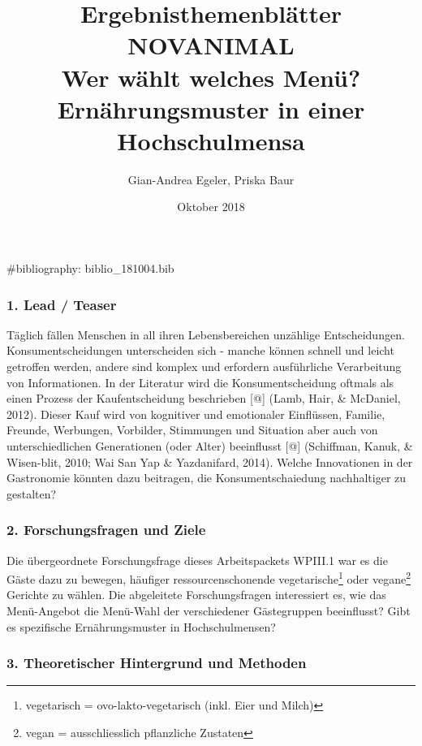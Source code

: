 \documentclass[12pt,ngerman,]{article}
\title{Ergebnisthemenblätter NOVANIMAL\\
Wer wählt welches Menü? Ernährungsmuster in einer Hochschulmensa}
\author{Gian-Andrea Egeler, Priska Baur}
\date{Oktober 2018}
\let\rmarkdownfootnote\footnote%
\def\footnote{\protect\rmarkdownfootnote}
\begin{document}
\maketitle

\#bibliography: biblio\_181004.bib

\hypertarget{lead-teaser}{%
\subsubsection{1. Lead / Teaser}\label{lead-teaser}}

Täglich fällen Menschen in all ihren Lebensbereichen unzählige
Entscheidungen. Konsumentscheidungen unterscheiden sich - manche können
schnell und leicht getroffen werden, andere sind komplex und erfordern
ausführliche Verarbeitung von Informationen. In der Literatur wird die
Konsumentscheidung oftmals als einen Prozess der Kaufentscheidung
beschrieben {[}@{]} (Lamb, Hair, \& McDaniel, 2012). Dieser Kauf wird
von kognitiver und emotionaler Einflüssen, Familie, Freunde, Werbungen,
Vorbilder, Stimmungen und Situation aber auch von unterschiedlichen
Generationen (oder Alter) beeinflusst {[}@{]} (Schiffman, Kanuk, \&
Wisen-blit, 2010; Wai San Yap \& Yazdanifard, 2014). Welche Innovationen
in der Gastronomie könnten dazu beitragen, die Konsumentschaiedung
nachhaltiger zu gestalten?

\hypertarget{forschungsfragen-und-ziele}{%
\subsubsection{2. Forschungsfragen und
Ziele}\label{forschungsfragen-und-ziele}}

Die übergeordnete Forschungsfrage dieses Arbeitspackets WPIII.1 war es
die Gäste dazu zu bewegen, häufiger ressourcenschonende
vegetarische\footnote{vegetarisch = ovo-lakto-vegetarisch (inkl. Eier
  und Milch)} oder vegane\footnote{vegan = ausschliesslich pflanzliche
  Zustaten} Gerichte zu wählen. Die abgeleitete Forschungsfragen
interessiert es, wie das Menü-Angebot die Menü-Wahl der verschiedener
Gästegruppen beeinflusst? Gibt es spezifische Ernährungsmuster in
Hochschulmensen?

\hypertarget{theoretischer-hintergrund-und-methoden}{%
\subsubsection{3. Theoretischer Hintergrund und
Methoden}\label{theoretischer-hintergrund-und-methoden}}
\end{document}
